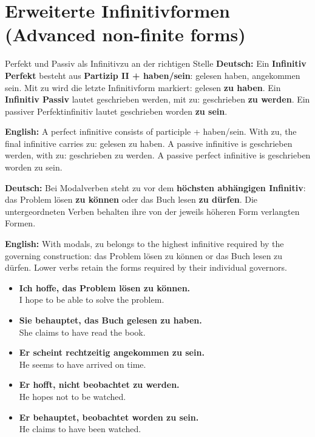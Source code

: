 \documentclass[a4paper,11pt]{article}
\newcommand{\GermanText}[1]{\textbf{Deutsch: }#1\par}
\newcommand{\EnglishText}[1]{{\small\color{SoftGray}\textbf{English: }#1\par}}
\newcommand{\ExampleItem}[2]{\item \textbf{#1}\\{\small\color{SoftGray}#2}}
\newcommand{\DEEN}[2]{\GermanText{#1}\EnglishText{#2}}
\newcommand{\Pair}[2]{\ExampleItem{#1}{#2}}
\begin{document}
\section{Erweiterte Infinitivformen \textnormal{(Advanced non-finite forms)}}
\begin{grammarentry}{Perfekt und Passiv als Infinitiv}{zu an der richtigen Stelle}
\DEEN{Ein \textbf{Infinitiv Perfekt} besteht aus \textbf{Partizip II + haben/sein}: \glqq gelesen haben\grqq, \glqq angekommen sein\grqq. Mit zu wird die letzte Infinitivform markiert: \glqq gelesen \textbf{zu haben}\grqq. Ein \textbf{Infinitiv Passiv} lautet \glqq geschrieben werden\grqq, mit zu: \glqq geschrieben \textbf{zu werden}\grqq. Ein passiver Perfektinfinitiv lautet \glqq geschrieben worden \textbf{zu sein}\grqq.}{A perfect infinitive consists of participle + haben/sein. With zu, the final infinitive carries zu: gelesen zu haben. A passive infinitive is geschrieben werden, with zu: geschrieben zu werden. A passive perfect infinitive is geschrieben worden zu sein.}
\DEEN{Bei Modalverben steht zu vor dem \textbf{höchsten abhängigen Infinitiv}: \glqq das Problem lösen \textbf{zu können}\grqq{} oder \glqq das Buch lesen \textbf{zu dürfen}\grqq. Die untergeordneten Verben behalten ihre von der jeweils höheren Form verlangten Formen.}{With modals, zu belongs to the highest infinitive required by the governing construction: das Problem lösen zu können or das Buch lesen zu dürfen. Lower verbs retain the forms required by their individual governors.}
\end{grammarentry}
\begin{exbox}\begin{itemize}
\Pair{Ich hoffe, das Problem lösen zu können.}{I hope to be able to solve the problem.}
\Pair{Sie behauptet, das Buch gelesen zu haben.}{She claims to have read the book.}
\Pair{Er scheint rechtzeitig angekommen zu sein.}{He seems to have arrived on time.}
\Pair{Er hofft, nicht beobachtet zu werden.}{He hopes not to be watched.}
\Pair{Er behauptet, beobachtet worden zu sein.}{He claims to have been watched.}
\end{itemize}\end{exbox}
\end{document}
